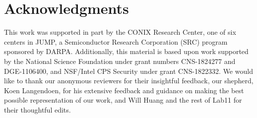 \section{Acknowledgments}
\label{sec:ack}

This work was supported in part by the CONIX Research Center, one of six
centers in JUMP, a Semiconductor Research Corporation (SRC) program sponsored
by DARPA. Additionally, this material is based upon work supported by the
National Science Foundation under grant numbers CNS-1824277 and DGE-1106400,
and NSF/Intel CPS Security under grant CNS-1822332.
We would like to thank our anonymous reviewers for their insightful feedback,
our shepherd, Koen Langendoen, for his extensive feedback and guidance on
making the best possible representation of our work, and Will Huang and the
rest of Lab11 for their thoughtful edits.


